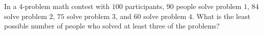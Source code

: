 In a $4$-problem math contest with $100$ participants, $90$ people solve problem $1$, $84$ solve problem $2$, $75$ solve problem $3$, and $60$ solve problem $4$. What is the least possible number of people who solved at least three of the problems?
